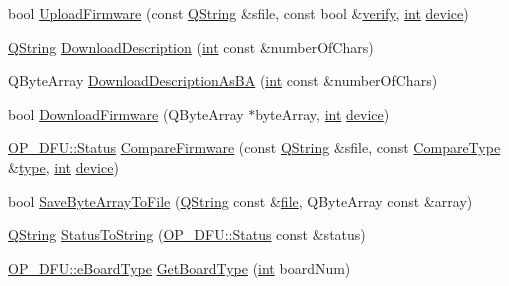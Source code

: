 \begin{DoxyCompactItemize}
bool \hyperlink{group___uploader_gacccdb64a8aa1c8ff0f90296fcb935fef}{Upload\-Firmware} (const \hyperlink{group___u_a_v_objects_plugin_gab9d252f49c333c94a72f97ce3105a32d}{Q\-String} \&sfile, const bool \&\hyperlink{analyze_raw_8m_a1835448b913ced5d93c9665a7a62b20d}{verify}, \hyperlink{ioapi_8h_a787fa3cf048117ba7123753c1e74fcd6}{int} \hyperlink{struct_o_p___d_f_u_1_1device}{device})
\item 
\hyperlink{group___u_a_v_objects_plugin_gab9d252f49c333c94a72f97ce3105a32d}{Q\-String} \hyperlink{group___uploader_ga5c3ae32c69bac4c663f6be430da1db3d}{Download\-Description} (\hyperlink{ioapi_8h_a787fa3cf048117ba7123753c1e74fcd6}{int} const \&number\-Of\-Chars)
\item 
Q\-Byte\-Array \hyperlink{group___uploader_gaa0f76d47015fa313a0bcf555bb0e690b}{Download\-Description\-As\-B\-A} (\hyperlink{ioapi_8h_a787fa3cf048117ba7123753c1e74fcd6}{int} const \&number\-Of\-Chars)
\item 
bool \hyperlink{group___uploader_ga8b88c71b81cbe00fe29938ac9b8a6dcf}{Download\-Firmware} (Q\-Byte\-Array $\ast$byte\-Array, \hyperlink{ioapi_8h_a787fa3cf048117ba7123753c1e74fcd6}{int} \hyperlink{struct_o_p___d_f_u_1_1device}{device})
\item 
\hyperlink{class_o_p___d_f_u_a83b075feaf572fe76e597acea58c8eda}{O\-P\-\_\-\-D\-F\-U\-::\-Status} \hyperlink{group___uploader_ga3c9852f8106d7177b5e27087f6e28764}{Compare\-Firmware} (const \hyperlink{group___u_a_v_objects_plugin_gab9d252f49c333c94a72f97ce3105a32d}{Q\-String} \&sfile, const \hyperlink{class_o_p___d_f_u_a687d96e45447775c09aced0f06db435b}{Compare\-Type} \&\hyperlink{glext_8h_a7d05960f4f1c1b11f3177dc963a45d86}{type}, \hyperlink{ioapi_8h_a787fa3cf048117ba7123753c1e74fcd6}{int} \hyperlink{struct_o_p___d_f_u_1_1device}{device})
\item 
bool \hyperlink{group___uploader_ga1422e01836cfff2d47cd09bfbbdde774}{Save\-Byte\-Array\-To\-File} (\hyperlink{group___u_a_v_objects_plugin_gab9d252f49c333c94a72f97ce3105a32d}{Q\-String} const \&\hyperlink{uavobjecttemplate_8m_a97c04efa65bcf0928abf9260bc5cbf46}{file}, Q\-Byte\-Array const \&array)
\item 
\hyperlink{group___u_a_v_objects_plugin_gab9d252f49c333c94a72f97ce3105a32d}{Q\-String} \hyperlink{group___uploader_gae048f84f5abd2be97bbe40fcf6e193c4}{Status\-To\-String} (\hyperlink{class_o_p___d_f_u_a83b075feaf572fe76e597acea58c8eda}{O\-P\-\_\-\-D\-F\-U\-::\-Status} const \&status)
\item 
\hyperlink{class_o_p___d_f_u_a7226d41298447c34a2c489cb47c470bd}{O\-P\-\_\-\-D\-F\-U\-::e\-Board\-Type} \hyperlink{group___uploader_ga9376138780f2860b37c7b9ae8af3f799}{Get\-Board\-Type} (\hyperlink{ioapi_8h_a787fa3cf048117ba7123753c1e74fcd6}{int} board\-Num)
\end{DoxyCompactItemize}

